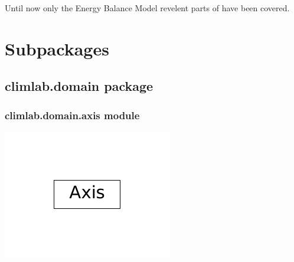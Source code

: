 \documentclass[a4paper,10pt,english]{sphinxmanual}
\begin{document}
Until now only the Energy Balance Model revelent parts of  have been covered.
\label{api/climlab:module-climlab}

\section{Subpackages}
\label{api/climlab:subpackages}

\subsection{climlab.domain package}
\label{api/climlab.domain:climlab-domain-package}\label{api/climlab.domain::doc}

\subsubsection{climlab.domain.axis module}
\label{api/climlab.domain:climlab-domain-axis-module}
\includegraphics{inheritance-ecdec26b4dd4dc2ffb13ee9d91595cd439ae67e7.pdf}
\label{api/climlab.domain:module-climlab.domain.axis}
\end{document}
